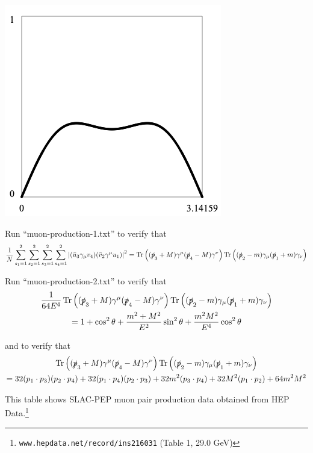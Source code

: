 \documentclass[12pt]{article}
\begin{document}
\begin{center}
\includegraphics[scale=0.5]{muon-production.png}
\end{center}

\newpage
\noindent
Run ``muon-production-1.txt'' to verify that
$$
\frac{1}{N}\sum_{s_1=1}^2\sum_{s_2=1}^2\sum_{s_3=1}^2\sum_{s_4=1}^2
\left|(\bar{u}_3\gamma_\mu v_4)(\bar{v}_2\gamma^\mu u_1)\right|^2
=
\mathop{\rm Tr}\left((\slashed{p}_3+M)\gamma^\mu(\slashed{p}_4-M)\gamma^\nu\right)
\mathop{\rm Tr}\left((\slashed{p}_2-m)\gamma_\mu(\slashed{p}_1+m)\gamma_\nu\right)
$$

\bigskip
\noindent
Run ``muon-production-2.txt'' to verify that
\begin{multline*}
\frac{1}{64E^4}
\mathop{\rm Tr}\left((\slashed{p}_3+M)\gamma^\mu(\slashed{p}_4-M)\gamma^\nu\right)
\mathop{\rm Tr}\left((\slashed{p}_2-m)\gamma_\mu(\slashed{p}_1+m)\gamma_\nu\right)
\\
=1+\cos^2\theta+\frac{m^2+M^2}{E^2}\sin^2\theta+\frac{m^2M^2}{E^4}\cos^2\theta
\end{multline*}

\noindent
and to verify that
\begin{multline*}
\mathop{\rm Tr}\left((\slashed{p}_3+M)\gamma^\mu(\slashed{p}_4-M)\gamma^\nu\right)
\mathop{\rm Tr}\left((\slashed{p}_2-m)\gamma_\mu(\slashed{p}_1+m)\gamma_\nu\right)
\\=
32 (p_1\cdot p_3) (p_2\cdot p_4) +
32 (p_1\cdot p_4) (p_2\cdot p_3) +
32 m^2 (p_3\cdot p_4) +
32 M^2 (p_1\cdot p_2) +
64 m^2 M^2
\end{multline*}

\newpage
\noindent
This table shows SLAC-PEP muon pair production data obtained from
HEP Data.\footnote{{\tt www.hepdata.net/record/ins216031} (Table 1, 29.0 GeV)}
\end{document}
